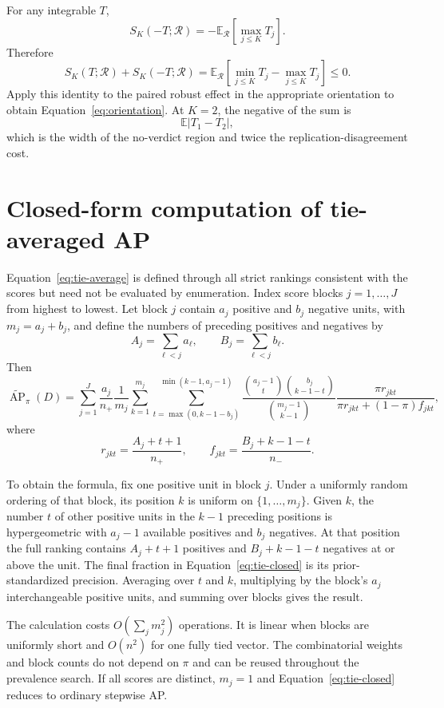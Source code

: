\documentclass[11pt]{article}
\newcommand{\AP}{\operatorname{AP}}
\newcommand{\Regime}{\mathcal{R}}
\newcommand{\E}{\mathbb{E}}
\newcommand{\APta}{\widetilde{\AP}}
\theoremstyle{remark}
\begin{document}
For any integrable $T$,
\[
S_K(-T;\Regime)
=
-\E_{\Regime}\left[\max_{j\leq K}T_j\right].
\]
Therefore
\[
S_K(T;\Regime)+S_K(-T;\Regime)
=
\E_{\Regime}
\left[
\min_{j\leq K}T_j-\max_{j\leq K}T_j
\right]
\leq0.
\]
Apply this identity to the paired robust effect in the appropriate orientation to obtain Equation~\eqref{eq:orientation}. At $K=2$, the negative of the sum is
\[
\E|T_1-T_2|,
\]
which is the width of the no-verdict region and twice the replication-disagreement cost.

\section{Closed-form computation of tie-averaged AP}
\label{app:tie-computation}

Equation~\eqref{eq:tie-average} is defined through all strict rankings consistent with the scores but need not be evaluated by enumeration. Index score blocks $j=1,\ldots,J$ from highest to lowest. Let block $j$ contain $a_j$ positive and $b_j$ negative units, with $m_j=a_j+b_j$, and define the numbers of preceding positives and negatives by
\[
A_j=\sum_{\ell<j}a_\ell,
\qquad
B_j=\sum_{\ell<j}b_\ell.
\]
Then
\begin{equation}
\APta_\pi(D)
=
\sum_{j=1}^{J}
\frac{a_j}{n_+}\frac1{m_j}
\sum_{k=1}^{m_j}
\sum_{t=\max(0,k-1-b_j)}^{\min(k-1,a_j-1)}
\frac{\binom{a_j-1}{t}\binom{b_j}{k-1-t}}
{\binom{m_j-1}{k-1}}
\frac{\pi r_{jkt}}
{\pi r_{jkt}+(1-\pi)f_{jkt}},
\label{eq:tie-closed}
\end{equation}
where
\[
r_{jkt}=\frac{A_j+t+1}{n_+},
\qquad
f_{jkt}=\frac{B_j+k-1-t}{n_-}.
\]

To obtain the formula, fix one positive unit in block $j$. Under a uniformly random ordering of that block, its position $k$ is uniform on $\{1,\ldots,m_j\}$. Given $k$, the number $t$ of other positive units in the $k-1$ preceding positions is hypergeometric with $a_j-1$ available positives and $b_j$ negatives. At that position the full ranking contains $A_j+t+1$ positives and $B_j+k-1-t$ negatives at or above the unit. The final fraction in Equation~\eqref{eq:tie-closed} is its prior-standardized precision. Averaging over $t$ and $k$, multiplying by the block's $a_j$ interchangeable positive units, and summing over blocks gives the result.

The calculation costs $O(\sum_jm_j^2)$ operations. It is linear when blocks are uniformly short and $O(n^2)$ for one fully tied vector. The combinatorial weights and block counts do not depend on $\pi$ and can be reused throughout the prevalence search. If all scores are distinct, $m_j=1$ and Equation~\eqref{eq:tie-closed} reduces to ordinary stepwise AP.
\end{document}
